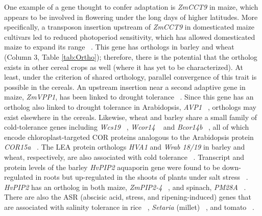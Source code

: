 \documentclass[12pt]{article}
\begin{document}
One example of a gene thought to confer adaptation is \textit{ZmCCT9} in maize, which appears to be involved in flowering under the long days of higher latitudes.
More specifically, a transposon insertion upstream of \textit{ZmCCT9} in domesticated maize cultivars led to reduced photoperiod sensitivity, which has allowed domesticated maize to expand its range ~\citep{Huang2017}. 
This gene has orthologs in barley and wheat (Column 3, Table \ref{tab:Ortho}); therefore, there is the potential that the ortholog exists in other cereal crops as well (where it has yet to be characterized).
At least, under the criterion of shared orthology, parallel convergence of this trait is possible in the cereals.
An upstream insertion near a second adaptive gene in maize, \textit{ZmVPP1}, has been linked to drought tolerance ~\citep{Wang2016}.
Since this gene has an ortholog also linked to drought tolerance in Arabidopsis, \textit{AVP1} ~\citep{Gaxiola2001}, orthologs may exist elsewhere in the cereals.
Likewise, wheat and barley share a small family of cold-tolerance genes including \textit{Wcs19} ~\citep{pmid8219063}, \textit{Wcor14} ~\citep{pmid10846621} and \textit{Bcor14b} ~\citep{pmid9952464}, all of which encode chloroplast-targeted COR proteins analogous to the Arabidopsis protein \textit{COR15a}  ~\citep{pmid9826741, Takumi2003}.
The LEA protein orthologs \textit{HVA1} and \textit{Wrab 18/19} in barley and wheat, respectively, are also associated with cold tolerance ~\citep{Hong1988, pmid16755132}.
Transcript and protein levels of the barley \textit{HvPIP2} aquaporin gene were found to be down-regulated in roots but up-regulated in the shoots of plants under salt stress ~\citep{Katsuhara2002}.
\textit{HvPIP2} has an ortholog in both maize, \textit{ZmPIP2-4} ~\citep{Zhu2005}, and spinach, \textit{PM28A} ~\citep{Fotiadis2000}.
There are also the ASR (abscisic acid, stress, and ripening-induced) genes that are associated with salinity tolerance in rice ~\citep{Joo2013}, \textit{Setaria} (millet) ~\citep{Li2017}, and tomato ~\citep{Konrad2008}.  
\end{document}
